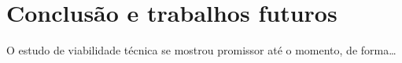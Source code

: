 \section{Conclusão e trabalhos futuros}\label{sec:conclusions}

O estudo de viabilidade técnica se mostrou promissor até o momento, de
forma\ldots
